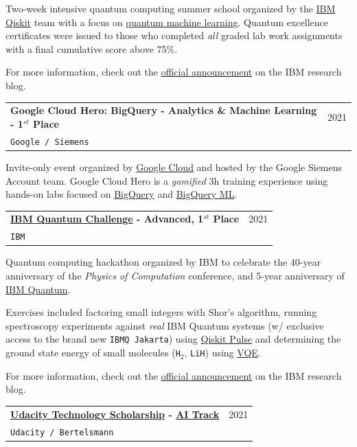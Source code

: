 \documentclass[letterpaper,11pt]{article}
\makeatletter
\newcommand{\resumeSubheading}[4]{
  \vspace{-2pt}\item
    \begin{tabular*}{0.97\textwidth}[t]{l@{\extracolsep{\fill}}r}
      \textbf{#1} & #2 \\
      \texttt{\small#3} & \textit{\small #4} \\
    \end{tabular*}\vspace{-7pt}
}
\makeatother
\begin{document}
    Two-week intensive quantum computing summer school organized by the \href{https://qiskit.org/}{IBM Qiskit} team with a focus on \href{https://medium.com/qiskit/introducing-qiskit-machine-learning-5f06b6597526}{quantum machine learning}. Quantum excellence certificates were issued to those who completed \emph{all} graded lab work assignments with a final cumulative score above 75\%.
    
    For more information, check out the \href{https://research.ibm.com/blog/qiskit-summer-school-machine-learning}{official announcement} on the IBM research blog.
    \vspace{2mm}
    \resumeSubheading
      {Google Cloud Hero: BigQuery - Analytics \& Machine Learning - 1$^{st}$ Place}{2021}
      {Google / Siemens}{}
    \vspace{3mm}
    
    Invite-only event organized by \href{https://cloud.google.com/}{Google Cloud} and hosted by the Google Siemens Account team. Google Cloud Hero is a \emph{gamified} 3h training experience using hands-on labs focused on \href{https://cloud.google.com/bigquery}{BigQuery} and \href{https://cloud.google.com/bigquery-ml/docs}{BigQuery ML}.
    \vspace{2mm}
    \resumeSubheading
      {\href{https://research.ibm.com/blog/quantum-challenge-2021}{IBM Quantum Challenge} - Advanced, 1$^{st}$ Place}{2021}
      {IBM}{}
    \vspace{3mm}
    
    Quantum computing hackathon organized by IBM to celebrate the 40-year anniversary of the \emph{Physics of Computation} conference, and 5-year anniversary of \href{https://quantum-computing.ibm.com/}{IBM Quantum}.
    
    Exercises included factoring small integers with Shor's algorithm, running spectroscopy experiments against \emph{real} IBM Quantum systems (w/ exclusive access to the brand new \texttt{IBMQ Jakarta}) using \href{https://qiskit.org/documentation/apidoc/pulse.html}{Qiskit Pulse} and determining the ground state energy of small molecules (\texttt{H}$_2$, \texttt{LiH}) using \href{https://qiskit.org/textbook/ch-applications/vqe-molecules.html}{VQE}.
    
    For more information, check out the \href{https://research.ibm.com/blog/quantum-challenge-2021}{official announcement} on the IBM research blog.
    \vspace{2mm}
    \resumeSubheading
      {\href{https://www.udacity.com/bertelsmann-tech-scholarships}{Udacity Technology Scholarship} - \href{https://sites.google.com/udacity.com/bertelsmann-tech-scholarship/ai-track}{AI Track}}{2021}
      {Udacity / Bertelsmann}{}
    \vspace{3mm}
    
\end{document}
